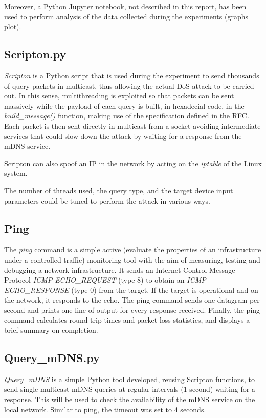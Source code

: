 \documentclass[fleqn, 11pt]{SelfArx} %
\begin{document}
Moreover, a Python Jupyter notebook, not described in this report, has been used to perform analysis of the data collected during the experiments (graphs plot).

\subsection{Scripton.py}
\textit{Scripton} is a Python script that is used during the experiment to send thousands of query packets in multicast, thus allowing the actual DoS attack to be carried out.
In this sense, multithreading is exploited so that packets can be sent massively while the payload of each query is built, in hexadecial code, in the \textit{build\_message()} function, making use of the specification defined in the RFC\cite{rfc6762}. Each packet is then sent directly in multicast from a socket avoiding intermediate services that could slow down the attack by waiting for a response from the mDNS service. \newline

Scripton can also spoof an IP in the network by acting on the \textit{iptable} of the Linux system. \newline

The number of threads used, the query type, and the target device input parameters could be tuned to perform the attack in various ways.

\subsection{Ping}
The \textit {ping} \cite{pingManPage} command is a simple active (evaluate the properties of an infrastructure under a controlled traffic) monitoring tool with the aim of measuring, testing and debugging a network infrastructure. It sends an Internet Control Message Protocol \textit{ICMP ECHO\_REQUEST} (type 8) to obtain an \textit{ICMP ECHO\_RESPONSE} (type 0) from the target. If the target is operational and on the network, it responds to the echo. The ping command sends one datagram per second and prints one line of output for every response received. Finally, the ping command calculates round-trip times and packet loss statistics, and displays a brief summary on completion.

\subsection{Query\_mDNS.py}
\textit{Query\_mDNS} is a simple Python tool developed, reusing Scripton functions, to send single multicast mDNS queries at regular intervals (1 second) waiting for a response. This will be used to check the availability of the mDNS service on the local network.\newline
Similar to ping, the timeout was set to 4 seconds.
\end{document}
